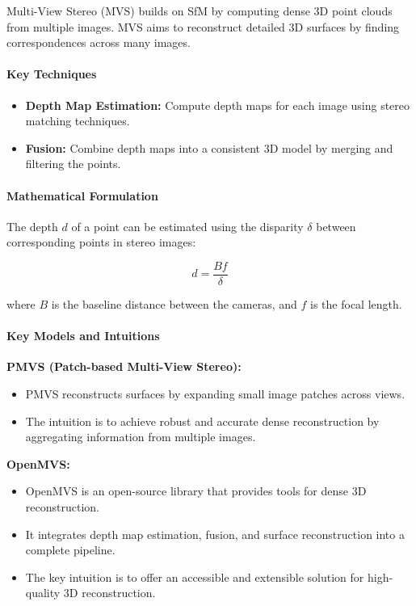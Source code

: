 \documentclass[12pt]{article}
\begin{document}
Multi-View Stereo (MVS) builds on SfM by computing dense 3D point clouds from multiple images. MVS aims to reconstruct detailed 3D surfaces by finding correspondences across many images.

\paragraph{Key Techniques}

\begin{itemize}
    \item \textbf{Depth Map Estimation:} Compute depth maps for each image using stereo matching techniques.
    \item \textbf{Fusion:} Combine depth maps into a consistent 3D model by merging and filtering the points.
\end{itemize}

\paragraph{Mathematical Formulation}

The depth \( d \) of a point can be estimated using the disparity \( \delta \) between corresponding points in stereo images:

\[
d = \frac{B f}{\delta}
\]

where \( B \) is the baseline distance between the cameras, and \( f \) is the focal length.

\paragraph{Key Models and Intuitions}

\textbf{PMVS (Patch-based Multi-View Stereo):}
\begin{itemize}
    \item PMVS reconstructs surfaces by expanding small image patches across views.
    \item The intuition is to achieve robust and accurate dense reconstruction by aggregating information from multiple images.
\end{itemize}

\textbf{OpenMVS:}
\begin{itemize}
    \item OpenMVS is an open-source library that provides tools for dense 3D reconstruction.
    \item It integrates depth map estimation, fusion, and surface reconstruction into a complete pipeline.
    \item The key intuition is to offer an accessible and extensible solution for high-quality 3D reconstruction.
\end{itemize}
\end{document}
